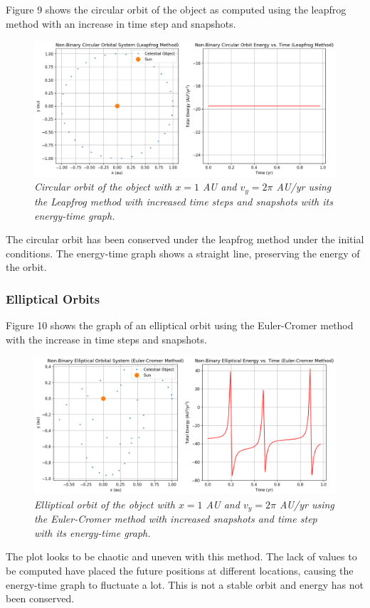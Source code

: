 \documentclass[11 pt, a4paper]{article}
\begin{document}
Figure 9 shows the circular orbit of the object as computed using the leapfrog method with an increase in time step and snapshots.
\begin{figure}[H]
  \includegraphics[width=1\linewidth]{Leapfrog/leapfrogcircularincrease.png}
  \centering
  \caption{\textit{Circular orbit of the object with $x = 1$ AU and $v_y = 2\pi$ AU/yr using the Leapfrog method with increased time steps and snapshots with its energy-time graph.}} 
\end{figure}
The circular orbit has been conserved under the leapfrog method under the initial conditions. The energy-time graph shows a straight line, preserving the energy of the orbit.

\subsubsection{Elliptical Orbits}
Figure 10 shows the graph of an elliptical orbit using the Euler-Cromer method with the increase in time steps and snapshots.
\begin{figure}[H]
  \includegraphics[width=1\linewidth]{Euler cromer/eulercromerellipticincrease.png}
  \centering
  \caption{\textit{Elliptical orbit of the object with $x = 1$ AU and $v_y = 2\pi$ AU/yr using the Euler-Cromer method with increased snapshots and time step with its energy-time graph.}} 
\end{figure}
The plot looks to be chaotic and uneven with this method. The lack of values to be computed have placed the future positions at different locations, causing the energy-time graph to fluctuate a lot. This is not
a stable orbit and energy has not been conserved.
\end{document}
